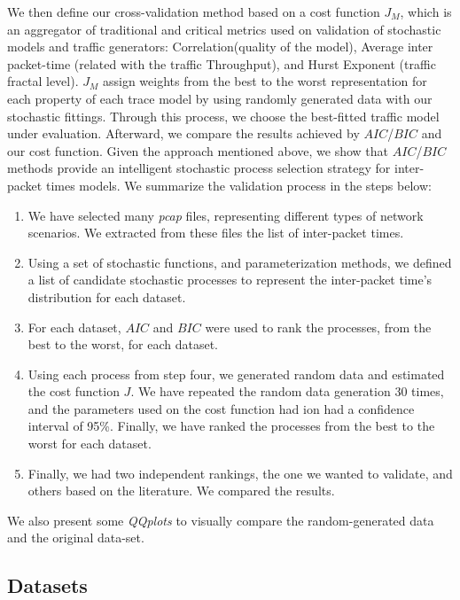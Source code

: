 We then define our cross-validation method based on a cost function $J_M$,  which is an aggregator of traditional and critical metrics used on validation of stochastic models and traffic generators: Correlation(quality of the model), Average inter packet-time (related with the traffic Throughput), and Hurst Exponent (traffic fractal level).  $J_M$ assign weights from the best to the worst representation for each property of each trace model by using randomly generated data with our stochastic fittings. Through this process, we choose the best-fitted traffic model under evaluation. Afterward, we compare the results achieved by $AIC$/$BIC$ and our cost function. Given the approach mentioned above, we show that $AIC$/$BIC$ methods provide an intelligent stochastic process selection strategy for inter-packet times models.
We summarize the validation process in the steps below:
\begin{enumerate}
\item We have selected many \textit{pcap} files, representing different types of network scenarios. We extracted from these files the list of inter-packet times.
\item Using a set of stochastic functions, and parameterization methods, we defined a list of candidate stochastic processes to represent the inter-packet time's distribution for each dataset.
\item For each dataset, $AIC$ and $BIC$  were used to rank the processes, from the best to the worst, for each dataset.
\item Using each process from step four,  we generated random data and estimated the cost function $J$. We have repeated the random data generation  30 times, and the parameters used on the cost function had ion had a confidence interval of 95\%. Finally, we have ranked the processes from the best to the worst for each dataset.
\item Finally, we had two independent rankings, the one we wanted to validate, and others based on the literature. We compared the results.
\end{enumerate}
  
We also present some \textit{QQplots} to visually compare the random-generated data and the original data-set. 


\subsection{Datasets}


